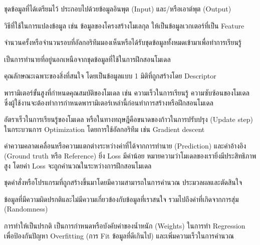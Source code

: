 \begin{description}[style=nextline]
    \item[Data set หรือ Dataset] ชุดข้อมูลที่ได้เตรียมไว้ ประกอบไปด้วยข้อมูลอินพุต (Input) และ/หรือเอาต์พุต (Output)

    \item[Descriptor] วิธีที่ใช้ในการแปลงข้อมูล เช่น ข้อมูลของโครงสร้างโมเลกุล ให้เป็นข้อมูลเวกเตอร์ที่เป็น Feature

    \item[Epoch] จำนวนครั้งหรือจำนวนรอบที่อัลกอริทึมมองเห็นหรือได้รับชุดข้อมูลทั้งหมดเข้ามาเพื่อทำการเรียนรู้

    \item[Extrapolation] เป็นการทำนายที่อยู่นอกเหนือจากชุดข้อมูลที่ใช้ในการฝึกสอนโมเดล

    \item[Feature] คุณลักษณะเฉพาะของสิ่งที่สนใจ โดยเป็นข้อมูลแบบ 1 มิติที่ถูกสร้างโดย Descriptor

    \item[Hyperparameter] พารามิเตอร์ขั้นสูงที่กำหนดคุณสมบัติของโมเดล เช่น ความเร็วในการเรียนรู้ ความซับซ้อนของโมเดล
    ซึ่งผู้ใช้งานจะต้องทำการกำหนดพารามิเตอร์เหล่านี้ก่อนทำการสร้างหรือฝึกสอนโมเดล

    \item[Learning rate] อัตราเร็วในการเรียนรู้ของโมเดล หรือในทางทฤษฎีคือขนาดของก้าวในการปรับปรุง (Update step) ในกระบวนการ 
    Optimization โดยการใช้อัลกอริทึม เช่น Gradient descent

    \item[Loss] ค่าความคลาดเคลื่อนหรือความแตกต่างระหว่างค่าที่ได้จากการทำนาย (Prediction) และค่าอ้างอิง (Ground truth หรือ 
    Reference) ยิ่ง Loss มีค่าน้อย หมายความว่าโมเดลของเรายิ่งมีประสิทธิภาพสูง โดยค่า Loss จะถูกคำนวณในระหว่างการฝึกสอนโมเดล

    \item[Model] ชุดคำสั่งหรือโปรแกรมที่ถูกสร้างขึ้นมาโดยมีความสามารถในการคำนวณ ประมวลผลและตัดสินใจ

    \item[Noise] ข้อมูลที่มีความผิดปรกติและไม่มีความเกี่ยวข้องกับข้อมูลที่เราสนใจ รวมไปถึงค่าที่เกิดจากการสุ่ม (Randomness)

    \item[Normalization] การทำให้เป็นปรกติ เป็นการกำหนดหรือบังคับค่าของน้ำหนัก (Weights) ในการทำ Regression เพื่อป้องกันปัญหา
    Overfitting (การ Fit ข้อมูลที่ดีเกินไป) และเพิ่มความเร็วในการคำนวณ


\end{description}
